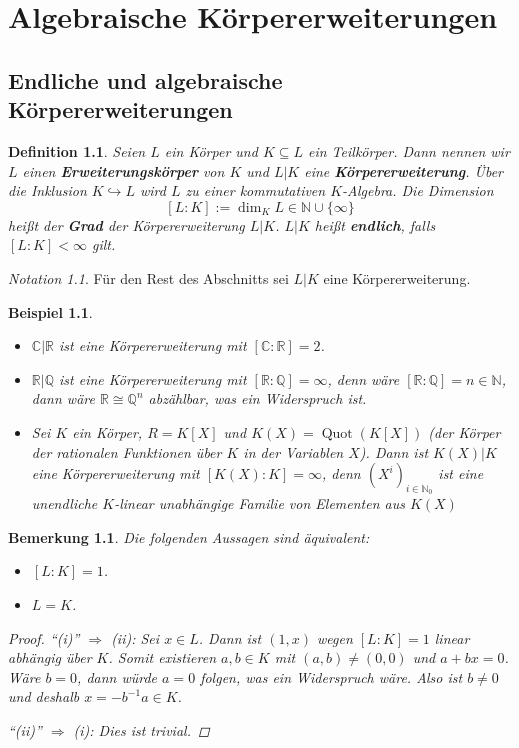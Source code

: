 \documentclass[a4paper, twoside, 11pt, ngerman]{report}
\newcommand{\CC}{\mathds C}
\newcommand{\NN}{\mathds N}
\newcommand{\QQ}{\mathds Q}
\newcommand{\RR}{\mathds R}
\DeclareMathOperator{\Quot}{Quot}
\theoremstyle{definistyle}
\newtheorem{defini}[satz]{Definition}
\newtheorem{bem}[satz]{Bemerkung}
\newtheorem{bsp}[satz]{Beispiel}
\theoremstyle{remark}
\newtheorem*{notation}{Notation}
\newcommand{\defn}[1]{\textit{\bfseries #1}}
\begin{document}
\chapter{Algebraische Körpererweiterungen}
\setcounter{section}{7}
\section{Endliche und algebraische Körpererweiterungen}

\begin{defini}\label{def:erweiterungskörper}
Seien $L$ ein Körper und $K \subseteq L$ ein Teilkörper. Dann nennen wir $L$ einen \defn{Erweiterungskörper} von $K$ und $L|K$ eine \defn{Körpererweiterung}. Über die Inklusion $K\hookrightarrow L$ wird $L$ zu einer kommutativen $K$-Algebra. Die Dimension
\[[L : K] := \dim_K L \in \NN \cup \{\infty\}\] 
heißt der \defn{Grad} der Körpererweiterung $L|K$.
$L|K$ heißt \defn{endlich}, falls $[L : K] < \infty$ gilt.
\end{defini}

\begin{notation}
Für den Rest des Abschnitts sei $L|K$ eine Körpererweiterung.
\end{notation}

\begin{bsp}\label{bsp:koerpererweiterungen}
\begin{itemize}
    \item[(a)] $\CC|\RR$ ist eine Körpererweiterung mit $[\CC : \RR] = 2$.
    \item[(b)] $\RR|\QQ$ ist eine Körpererweiterung mit $[\RR : \QQ] = \infty$, denn wäre $[\RR : \QQ]=n \in \NN$, dann wäre $\RR\cong\QQ^n$ abzählbar, was ein Widerspruch ist.
    \item[(c)] Sei $K$ ein Körper, $R = K[X]$ und $K(X) = \Quot(K[X])$ (der Körper der rationalen Funktionen über $K$ in der Variablen $X$). Dann ist $K(X)|K$ eine Körpererweiterung mit $[K(X) : K] = \infty$, denn $(X^i)_{i \in \NN_0}$ ist eine unendliche $K$-linear unabhängige Familie von Elementen aus $K(X)$
\end{itemize}
\end{bsp}

\begin{bem}\label{bem:triviale_erweiterung}
Die folgenden Aussagen sind äquivalent:
\begin{itemize}
    \item[(i)] $[L : K] = 1$.
    \item[(ii)] $L = K$.
\end{itemize}
\begin{proof}
"`(i)"' $\Rightarrow$ (ii): Sei $x \in L$. Dann ist $(1, x)$ wegen $[L:K]=1$ linear abhängig über $K$. Somit existieren $a,b\in K$ mit $(a,b)\neq(0,0)$ und $a+bx=0$. Wäre $b=0$, dann würde $a=0$ folgen, was ein Widerspruch wäre. Also ist $b\neq0$ und deshalb
$x=-b^{-1}a\in K$.

"`(ii)"' $\Rightarrow$ (i): Dies ist trivial.
\end{proof}
\end{bem}
\end{document}
